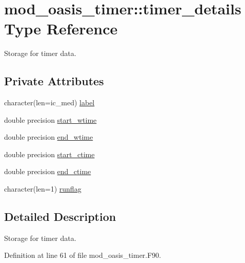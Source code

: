 \hypertarget{structmod__oasis__timer_1_1timer__details}{\section{mod\+\_\+oasis\+\_\+timer\+:\+:timer\+\_\+details Type Reference}
\label{structmod__oasis__timer_1_1timer__details}
}


Storage for timer data.  


\subsection*{Private Attributes}
\begin{DoxyCompactItemize}
\item 
character(len=ic\+\_\+med) \hyperlink{structmod__oasis__timer_1_1timer__details_a772c22856aef70d86030ba7aed99f85d}{label}
\item 
double precision \hyperlink{structmod__oasis__timer_1_1timer__details_a1b05dff81a75201d26ba232a265f70d0}{start\+\_\+wtime}
\item 
double precision \hyperlink{structmod__oasis__timer_1_1timer__details_af4ddda3c6547e993f367a5221671c50b}{end\+\_\+wtime}
\item 
double precision \hyperlink{structmod__oasis__timer_1_1timer__details_a2922806fc675af7b8aa9ab042bddfc24}{start\+\_\+ctime}
\item 
double precision \hyperlink{structmod__oasis__timer_1_1timer__details_a6203f13dc289b25e994b08b837636afc}{end\+\_\+ctime}
\item 
character(len=1) \hyperlink{structmod__oasis__timer_1_1timer__details_ac91fc6e6c7d8bca9c4519b506714384a}{runflag}
\end{DoxyCompactItemize}


\subsection{Detailed Description}
Storage for timer data. 

Definition at line 61 of file mod\+\_\+oasis\+\_\+timer.\+F90.



